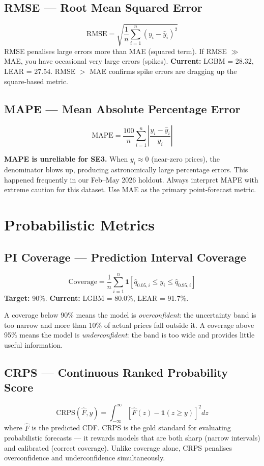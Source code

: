 \documentclass[12pt, a4paper, oneside]{memoir}
\begin{document}
\subsection{RMSE --- Root Mean Squared Error}
\[
  \text{RMSE} = \sqrt{\frac{1}{n}\sum_{i=1}^{n}(y_i - \hat{y}_i)^2}
\]
RMSE penalises large errors more than MAE (squared term). If RMSE $\gg$ MAE, you have
occasional very large errors (spikes). \textbf{Current:} LGBM = 28.32, LEAR = 27.54.
RMSE $>$ MAE confirms spike errors are dragging up the square-based metric.

\subsection{MAPE --- Mean Absolute Percentage Error}
\[
  \text{MAPE} = \frac{100}{n}\sum_{i=1}^{n}\left|\frac{y_i - \hat{y}_i}{y_i}\right|
\]
\begin{warningbox}
\textbf{MAPE is unreliable for SE3.} When $y_i \approx 0$ (near-zero prices), the
denominator blows up, producing astronomically large percentage errors. This happened
frequently in our Feb--May 2026 holdout. Always interpret MAPE with extreme caution
for this dataset. Use MAE as the primary point-forecast metric.
\end{warningbox}

\section{Probabilistic Metrics}

\subsection{PI Coverage --- Prediction Interval Coverage}
\[
  \text{Coverage} = \frac{1}{n}\sum_{i=1}^{n} \mathbf{1}\!\left[
    \hat{q}_{0.05,i} \leq y_i \leq \hat{q}_{0.95,i}
  \right]
\]
\textbf{Target:} 90\%. \textbf{Current:} LGBM = 80.0\%, LEAR = 91.7\%.

A coverage below 90\% means the model is \emph{overconfident}: the uncertainty band
is too narrow and more than 10\% of actual prices fall outside it.
A coverage above 95\% means the model is \emph{underconfident}: the band is too wide
and provides little useful information.

\subsection{CRPS --- Continuous Ranked Probability Score}
\[
  \text{CRPS}(\hat{F}, y) = \int_{-\infty}^{\infty}
    \left[\hat{F}(z) - \mathbf{1}(z \geq y)\right]^2 dz
\]
where $\hat{F}$ is the predicted CDF. CRPS is the gold standard for evaluating
probabilistic forecasts --- it rewards models that are both sharp (narrow intervals)
and calibrated (correct coverage). Unlike coverage alone, CRPS penalises
overconfidence and underconfidence simultaneously.
\end{document}
